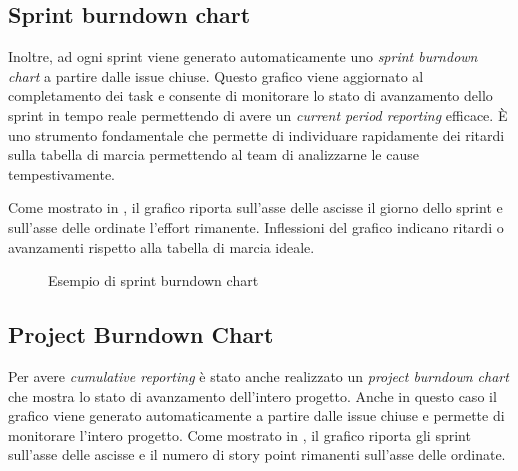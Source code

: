 \subsection{Sprint burndown chart}
Inoltre, ad ogni sprint viene generato automaticamente uno \emph{sprint burndown chart} a partire dalle issue chiuse. Questo grafico viene aggiornato al completamento dei task e consente di monitorare lo stato di avanzamento dello sprint in tempo reale permettendo di avere un \emph{current period reporting} efficace.
È uno strumento fondamentale che permette di individuare rapidamente dei ritardi sulla tabella di marcia permettendo al team di analizzarne le cause tempestivamente.

Come mostrato in , il grafico riporta sull'asse delle ascisse il giorno dello sprint e sull'asse delle ordinate l'effort rimanente. Inflessioni del grafico indicano ritardi o avanzamenti rispetto alla tabella di marcia ideale.

\begin{figure}[htp]
  \centering
  \caption{Esempio di sprint burndown chart}
  \label{fig:sprint-burndown-chart}
\end{figure}

\subsection{Project Burndown Chart}
Per avere \emph{cumulative reporting} è stato anche realizzato un \emph{project burndown chart} che mostra lo stato di avanzamento dell'intero progetto.
Anche in questo caso il grafico viene generato automaticamente a partire dalle issue chiuse e permette di monitorare l'intero progetto.
Come mostrato in , il grafico riporta gli sprint sull'asse delle ascisse e il numero di story point rimanenti sull'asse delle ordinate.


